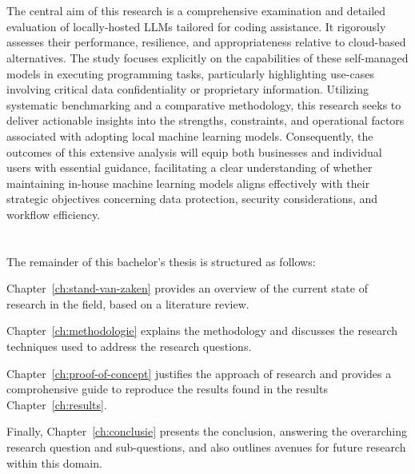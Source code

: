\section{}%
\label{sec:onderzoeksdoelstelling}

The central aim of this research is a comprehensive examination and detailed evaluation of locally-hosted \glspl{LLM} tailored for coding assistance. It rigorously assesses their performance, resilience, and appropriateness relative to cloud-based alternatives. The study focuses explicitly on the capabilities of these self-managed models in executing programming tasks, particularly highlighting use-cases involving critical data confidentiality or proprietary information. Utilizing systematic benchmarking and a comparative methodology, this research seeks to deliver actionable insights into the strengths, constraints, and operational factors associated with adopting local machine learning models. Consequently, the outcomes of this extensive analysis will equip both businesses and individual users with essential guidance, facilitating a clear understanding of whether maintaining in-house machine learning models aligns effectively with their strategic objectives concerning data protection, security considerations, and workflow efficiency.
\section{}%
\label{sec:opzet-bachelorproef}


The remainder of this bachelor's thesis is structured as follows:

Chapter~\ref{ch:stand-van-zaken} provides an overview of the current state of research in the field, based on a literature review.

Chapter~\ref{ch:methodologie} explains the methodology and discusses the research techniques used to address the research questions.

Chapter~\ref{ch:proof-of-concept} justifies the approach of research and provides a comprohensive guide to reproduce the results found in the results Chapter~\ref{ch:results}.


Finally, Chapter~\ref{ch:conclusie} presents the conclusion, answering the overarching research question and sub-questions, and also outlines avenues for future research within this domain.